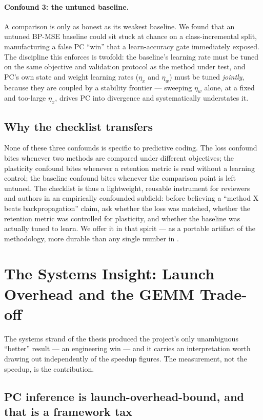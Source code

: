 \paragraph{Confound 3: the untuned baseline.}
A comparison is only as honest as its weakest baseline. We found that an untuned BP-MSE baseline
could sit stuck at chance on a class-incremental split, manufacturing a false PC ``win'' that a
learn-accuracy gate immediately exposed. The discipline this enforces is twofold: the baseline's
learning rate must be tuned on the same objective and validation protocol as the method under test,
and PC's own state and weight learning rates ($\eta_x$ and $\eta_w$) must be tuned \emph{jointly},
because they are coupled by a stability frontier --- sweeping $\eta_w$ alone, at a fixed and
too-large $\eta_x$, drives PC into divergence and systematically understates it.

\subsection{Why the checklist transfers}

None of these three confounds is specific to predictive coding. The loss confound bites whenever two
methods are compared under different objectives; the plasticity confound bites whenever a retention
metric is read without a learning control; the baseline confound bites whenever the comparison point
is left untuned. The checklist is thus a lightweight, reusable instrument for reviewers and authors
in an empirically confounded subfield: before believing a ``method X beats backpropagation'' claim,
ask whether the loss was matched, whether the retention metric was controlled for plasticity, and
whether the baseline was actually tuned to learn. We offer it in that spirit --- as a portable
artifact of the methodology, more durable than any single number in .

\section{The Systems Insight: Launch Overhead and the GEMM Trade-off}\label{sec:disc-systems}

The systems strand of the thesis produced the project's only unambiguous ``better'' result --- an
engineering win --- and it carries an interpretation worth drawing out independently of the speedup
figures. The measurement, not the speedup, is the contribution.

\subsection{PC inference is launch-overhead-bound, and that is a framework tax}

